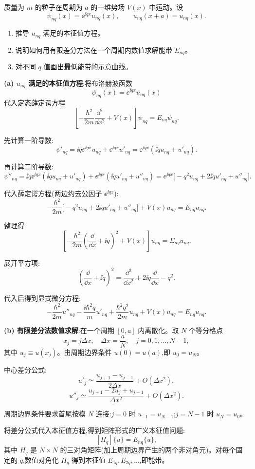 \begin{question}
质量为 $m$ 的粒子在周期为 $a$ 的一维势场 $V(x)$ 中运动。设
\[
\psi_{nq}(x)=\ee^{\ii qx}u_{nq}(x),\qquad u_{nq}(x+a)=u_{nq}(x).
\]
\begin{enumerate}
\item 推导 $u_{nq}$ 满足的本征值方程。
\item 说明如何用有限差分方法在一个周期内数值求解能带 $E_{nq}$。
\item 对不同 $q$ 值画出最低能带的示意曲线。
\end{enumerate}
\end{question}
\begin{solution}
	\textbf{(a) $u_{nq}$ 满足的本征值方程}:将布洛赫波函数
	\[
	\psi_{nq}(x)=\ee^{\ii qx}u_{nq}(x)
	\]
	代入定态薛定谔方程
	\[
	\left[-\frac{\hbar^2}{2m}\frac{\dd^2}{\dd x^2}+V(x)\right]\psi_{nq}=E_{nq}\psi_{nq}.
	\]

	先计算一阶导数:
	\[
	\psi'_{nq}= \ii q \ee^{\ii qx}u_{nq}+ \ee^{\ii qx}u'_{nq}=\ee^{\ii qx}(\ii q u_{nq}+u'_{nq}).
	\]

	再计算二阶导数:
	\[
	\psi''_{nq}= \ii q \ee^{\ii qx}(\ii q u_{nq}+u'_{nq})+ \ee^{\ii qx}(\ii q u'_{nq}+u''_{nq})
	=\ee^{\ii qx}\big[-\!q^2u_{nq}+2\ii q u'_{nq}+u''_{nq}\big].
	\]

	代入薛定谔方程(两边约去公因子 $\ee^{\ii qx}$):
	\[
	-\frac{\hbar^2}{2m}\big[-q^2u_{nq}+2\ii q u'_{nq}+u''_{nq}\big]+V(x)u_{nq}=E_{nq}u_{nq}.
	\]

	整理得
	\[
	\left[-\frac{\hbar^2}{2m}\left(\frac{\dd}{\dd x}+\ii q\right)^2+V(x)\right]u_{nq}=E_{nq}u_{nq}.
	\]

	展开平方项:
	\[
	\left(\frac{\dd}{\dd x}+\ii q\right)^2=\frac{\dd^2}{\dd x^2}+2\ii q\frac{\dd}{\dd x}-q^2.
	\]

	代入后得到显式微分方程:
	\[
	-\frac{\hbar^2}{2m}u''_{nq}-\frac{\ii\hbar^2 q}{m}u'_{nq}+\frac{\hbar^2 q^2}{2m}u_{nq}+V(x)u_{nq}=E_{nq}u_{nq}.
	\]

	\textbf{(b) 有限差分法数值求解}:在一个周期 $[0,a]$ 内离散化。取 $N$ 个等分格点
	\[
	x_j=j\Delta x,\quad \Delta x=\frac{a}{N},\quad j=0,1,\ldots,N-1,
	\]
	其中 $u_j\equiv u(x_j)$。由周期边界条件 $u(0)=u(a)$,即 $u_0=u_N$。

	中心差分公式:
	\[
	u'_j\simeq\frac{u_{j+1}-u_{j-1}}{2\Delta x}+O(\Delta x^2),
	\]
	\[
	u''_j\simeq\frac{u_{j+1}-2u_j+u_{j-1}}{\Delta x^2}+O(\Delta x^2).
	\]

	周期边界条件要求首尾按模 $N$ 连接:$j=0$ 时 $u_{-1}=u_{N-1}$;$j=N-1$ 时 $u_N=u_0$。

	将差分公式代入本征值方程,得到矩阵形式的广义本征值问题:
	\[
	[H_q]\{u\}=E_{nq}\{u\},
	\]
	其中 $H_q$ 是 $N\times N$ 的三对角矩阵(加上周期边界产生的两个非对角元)。对每个固定的 $q$,数值对角化 $H_q$ 得到本征值 $E_{1q},E_{2q},\ldots$,即能带。


\end{solution}

